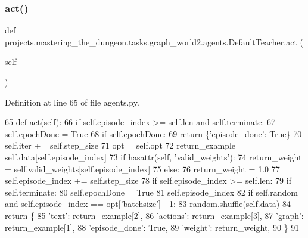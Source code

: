 \subsubsection{\texorpdfstring{act()}{act()}}
{\footnotesize\ttfamily def projects.\+mastering\+\_\+the\+\_\+dungeon.\+tasks.\+graph\+\_\+world2.\+agents.\+Default\+Teacher.\+act (\begin{DoxyParamCaption}\item[{}]{self }\end{DoxyParamCaption})}



Definition at line 65 of file agents.\+py.


\begin{DoxyCode}
65     \textcolor{keyword}{def }act(self):
66         \textcolor{keywordflow}{if} self.episode\_index >= self.len \textcolor{keywordflow}{and} self.terminate:
67             self.epochDone = \textcolor{keyword}{True}
68         \textcolor{keywordflow}{if} self.epochDone:
69             \textcolor{keywordflow}{return} \{\textcolor{stringliteral}{'episode\_done'}: \textcolor{keyword}{True}\}
70         self.iter += self.step\_size
71         opt = self.opt
72         return\_example = self.data[self.episode\_index]
73         \textcolor{keywordflow}{if} hasattr(self, \textcolor{stringliteral}{'valid\_weights'}):
74             return\_weight = self.valid\_weights[self.episode\_index]
75         \textcolor{keywordflow}{else}:
76             return\_weight = 1.0
77         self.episode\_index += self.step\_size
78         \textcolor{keywordflow}{if} self.episode\_index >= self.len:
79             \textcolor{keywordflow}{if} self.terminate:
80                 self.epochDone = \textcolor{keyword}{True}
81             self.episode\_index %
82             \textcolor{keywordflow}{if} self.random \textcolor{keywordflow}{and} self.episode\_index == opt[\textcolor{stringliteral}{'batchsize'}] - 1:
83                 random.shuffle(self.data)
84         \textcolor{keywordflow}{return} \{
85             \textcolor{stringliteral}{'text'}: return\_example[2],
86             \textcolor{stringliteral}{'actions'}: return\_example[3],
87             \textcolor{stringliteral}{'graph'}: return\_example[1],
88             \textcolor{stringliteral}{'episode\_done'}: \textcolor{keyword}{True},
89             \textcolor{stringliteral}{'weight'}: return\_weight,
90         \}
91 
\end{DoxyCode}
\mbox{\label{classprojects_1_1mastering__the__dungeon_1_1tasks_1_1graph__world2_1_1agents_1_1DefaultTeacher_a0e4a15ea70cf53e2e02a57b31561430a}} 
